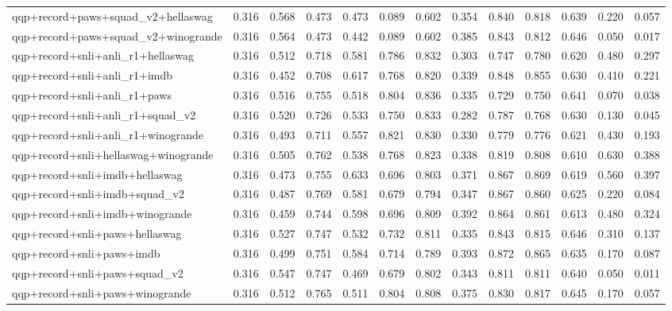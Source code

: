 \begin{table}[t]
\begin{tabular}{lrrrrrrrrrrrr}
    qqp+record+paws+squad\_v2+hellaswag & 0.316 & 0.568 & 0.473 & 0.473 & 0.089 & 0.602 & 0.354 & 0.840 & 0.818 & 0.639 & 0.220 & 0.057 \\
    qqp+record+paws+squad\_v2+winogrande & 0.316 & 0.564 & 0.473 & 0.442 & 0.089 & 0.602 & 0.385 & 0.843 & 0.812 & 0.646 & 0.050 & 0.017 \\
    qqp+record+snli+anli\_r1+hellaswag & 0.316 & 0.512 & 0.718 & 0.581 & 0.786 & 0.832 & 0.303 & 0.747 & 0.780 & 0.620 & 0.480 & 0.297 \\
    qqp+record+snli+anli\_r1+imdb & 0.316 & 0.452 & 0.708 & 0.617 & 0.768 & 0.820 & 0.339 & 0.848 & 0.855 & 0.630 & 0.410 & 0.221 \\
    qqp+record+snli+anli\_r1+paws & 0.316 & 0.516 & 0.755 & 0.518 & 0.804 & 0.836 & 0.335 & 0.729 & 0.750 & 0.641 & 0.070 & 0.038 \\
    qqp+record+snli+anli\_r1+squad\_v2 & 0.316 & 0.520 & 0.726 & 0.533 & 0.750 & 0.833 & 0.282 & 0.787 & 0.768 & 0.630 & 0.130 & 0.045 \\
    qqp+record+snli+anli\_r1+winogrande & 0.316 & 0.493 & 0.711 & 0.557 & 0.821 & 0.830 & 0.330 & 0.779 & 0.776 & 0.621 & 0.430 & 0.193 \\
    qqp+record+snli+hellaswag+winogrande & 0.316 & 0.505 & 0.762 & 0.538 & 0.768 & 0.823 & 0.338 & 0.819 & 0.808 & 0.610 & 0.630 & 0.388 \\
    qqp+record+snli+imdb+hellaswag & 0.316 & 0.473 & 0.755 & 0.633 & 0.696 & 0.803 & 0.371 & 0.867 & 0.869 & 0.619 & 0.560 & 0.397 \\
    qqp+record+snli+imdb+squad\_v2 & 0.316 & 0.487 & 0.769 & 0.581 & 0.679 & 0.794 & 0.347 & 0.867 & 0.860 & 0.625 & 0.220 & 0.084 \\
    qqp+record+snli+imdb+winogrande & 0.316 & 0.459 & 0.744 & 0.598 & 0.696 & 0.809 & 0.392 & 0.864 & 0.861 & 0.613 & 0.480 & 0.324 \\
    qqp+record+snli+paws+hellaswag & 0.316 & 0.527 & 0.747 & 0.532 & 0.732 & 0.811 & 0.335 & 0.843 & 0.815 & 0.646 & 0.310 & 0.137 \\
    qqp+record+snli+paws+imdb & 0.316 & 0.499 & 0.751 & 0.584 & 0.714 & 0.789 & 0.393 & 0.872 & 0.865 & 0.635 & 0.170 & 0.087 \\
    qqp+record+snli+paws+squad\_v2 & 0.316 & 0.547 & 0.747 & 0.469 & 0.679 & 0.802 & 0.343 & 0.811 & 0.811 & 0.640 & 0.050 & 0.011 \\
    qqp+record+snli+paws+winogrande & 0.316 & 0.512 & 0.765 & 0.511 & 0.804 & 0.808 & 0.375 & 0.830 & 0.817 & 0.645 & 0.170 & 0.057 \\

\end{tabular}
\end{table}

